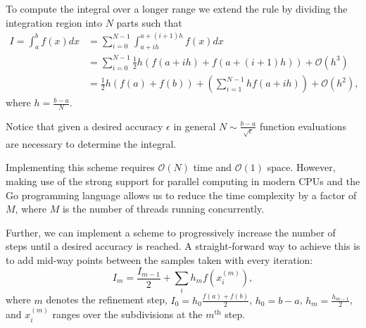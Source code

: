 \documentclass[10pt, a4paper]{article}
\begin{document}

  To compute the integral over a longer range we extend the rule by dividing the integration
  region into $N$ parts such that
  \begin{equation}
  \begin{split}
  I = \int_a^b f(x) dx & = \sum_{i=0}^{N-1} \int_{a+ih}^{a+(i+1)h} f(x) dx \\
  & = \sum_{i=0}^{N-1} \frac{1}{2} h (f(a+ih) + f(a+(i+1)h)) + \mathcal{O}(h^3) \\
  & = \frac{1}{2} h (f(a) + f(b)) + \left( \sum_{i=1}^{N-1} h f(a+ih) \right) + \mathcal{O}(h^2),
  \end{split}
  \end{equation}
  where $h = \frac{b-a}{N}$.

  Notice that given a desired accuracy $\epsilon$ in general $N \sim \frac{b-a}{\sqrt{\epsilon}}$
  function evaluations are necessary to determine the integral.

  Implementing this scheme requires $\mathcal{O}(N)$ time and $\mathcal{O}(1)$ space. However, making
  use of the strong support for parallel computing in modern CPUs and the Go programming language allows
  us to reduce the time complexity by a factor of $M$, where $M$ is the number of threads
  running concurrently\footnotemark.


  Further, we can implement a scheme to progressively increase the number of steps until
  a desired accuracy is reached. A straight-forward way to achieve this is to add mid-way points
  between the samples taken with every iteration:
  \begin{equation}
  \label{eq:trap-rec}
  I_m = \frac{I_{m-1}}{2} + \sum_i h_m f(x^{(m)}_i),
  \end{equation}
  where $m$ denotes the refinement step, $I_0 = h_0\frac{f(a) + f(b)}{2}$, $h_0 = b-a$,
  $h_m = \frac{h_{m-1}}{2}$, and $x^{(m)}_i$
  ranges over the subdivisions at the $m^{\text{th}}$ step.
\end{document}
